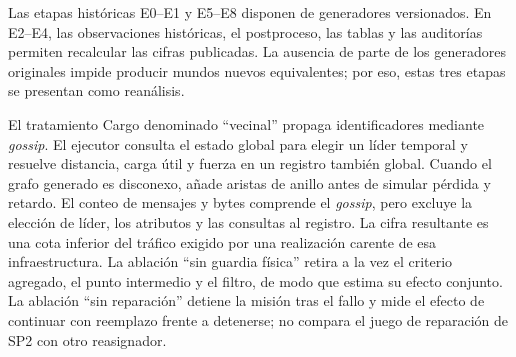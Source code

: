 Las etapas históricas E0--E1 y E5--E8 disponen de generadores versionados. En E2--E4, las
observaciones históricas, el postproceso, las tablas y las auditorías permiten
recalcular las cifras publicadas. La ausencia de parte de los generadores
originales impide producir mundos nuevos equivalentes; por eso, estas tres etapas
se presentan como reanálisis.

El tratamiento Cargo denominado ``vecinal'' propaga identificadores mediante
\emph{gossip}. El ejecutor consulta el estado global para elegir un líder
temporal y resuelve distancia, carga útil y fuerza en un registro también global.
Cuando el grafo generado es disconexo, añade aristas de anillo antes de simular
pérdida y retardo. El conteo de mensajes y bytes comprende el \emph{gossip}, pero
excluye la elección de líder, los atributos y las consultas al registro. La cifra
resultante es una cota inferior del tráfico exigido por una realización carente
de esa infraestructura. La ablación ``sin guardia física'' retira a la vez el
criterio agregado, el punto intermedio y el filtro, de modo que estima su efecto
conjunto. La ablación ``sin reparación'' detiene la misión tras el fallo y mide
el efecto de continuar con reemplazo frente a detenerse; no compara el juego de reparación de SP2
con otro reasignador.

